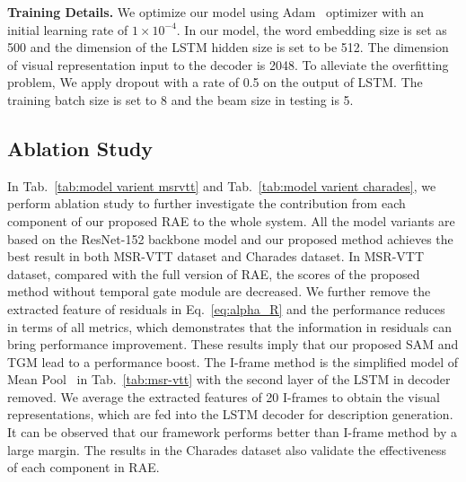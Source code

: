 \documentclass[a4paper,conference]{IEEEtran}
\begin{document}
 

\noindent\textbf{Training Details.} We optimize our model using Adam~\cite{kingma2014adam} optimizer with an initial learning rate of $1\times10^{-4}$. In our model, the word embedding size is set as 500 and the dimension of the LSTM hidden size is set to be 512. The dimension of visual representation input to the decoder is 2048. To alleviate the overfitting problem, We apply dropout with a rate of 0.5 on the output of LSTM. The training batch size is set to 8 and the beam size in testing is 5.


\subsection{Ablation Study}
In Tab.~\ref{tab:model varient msrvtt} and Tab.~\ref{tab:model varient charades}, we perform ablation study to further investigate the contribution from each component of our proposed RAE to the whole system. %
All the model variants are based on the ResNet-152 backbone model and our proposed method achieves the best result in both MSR-VTT dataset and Charades dataset. 
In MSR-VTT dataset, compared with the full version of RAE, the scores of the proposed method without temporal gate module are decreased. We further remove the extracted feature of residuals in Eq.~\ref{eq:alpha_R} and the performance reduces in terms of all metrics, which demonstrates that the information in residuals can bring performance improvement. These results imply that our proposed SAM and TGM lead to a performance boost. The I-frame method is the simplified model of Mean Pool~\cite{venugopalan2014translating} in Tab.~\ref{tab:msr-vtt} with the second layer of the LSTM in decoder removed. We average the extracted features of 20 I-frames to obtain the visual representations, which are fed into the LSTM decoder for description generation. It can be observed that our framework performs better than I-frame method by a large margin. The results in the Charades dataset also validate the effectiveness of each component in RAE. 
\end{document}
